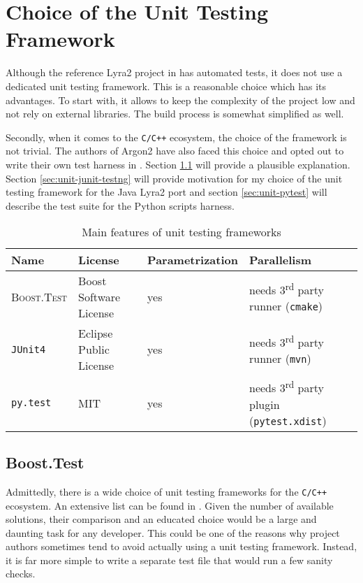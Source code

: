 \section{Choice of the Unit Testing Framework}

Although the reference Lyra2 project in \cite{github:2017:lyra} has automated tests, it does not use a dedicated unit testing framework. This is a reasonable choice which has its advantages. To start with, it allows to keep the complexity of the project low and not rely on external libraries. The build process is somewhat simplified as well.

Secondly, when it comes to the \texttt{C/C++} ecosystem, the choice of the framework is not trivial. The authors of Argon2 have also faced this choice and opted out to write their own test harness in \cite{github:2017:argon2-test.c}. Section \ref{sec:unit-boost-google} will provide a plausible explanation. Section \ref{sec:unit-junit-testng} will provide motivation for my choice of the unit testing framework for the Java Lyra2 port and section \ref{sec:unit-pytest} will describe the test suite for the Python scripts harness.

\begin{table}
\begin{tabular}{llll}
    Name & License & Parametrization & Parallelism \\ \hline
\textsc{Boost.Test} & Boost Software License & yes & needs 3\textsuperscript{rd} party runner (\texttt{cmake}) \\
\texttt{JUnit4} & Eclipse Public License & yes & needs 3\textsuperscript{rd} party runner (\texttt{mvn}) \\
\texttt{py.test} & MIT & yes & needs 3\textsuperscript{rd} party plugin (\texttt{pytest.xdist})
\end{tabular}
\caption{Main features of unit testing frameworks}
\label{table:framework-features-cpp}
\end{table}

\subsection{Boost.Test}
\label{sec:unit-boost-google}

Admittedly, there is a wide choice of unit testing frameworks for the \texttt{C/C++} ecosystem. An extensive list can be found in \cite{wiki:2017:frameworks-c, wiki:2017:frameworks-cpp}. Given the number of available solutions, their comparison and an educated choice would be a large and daunting task for any developer. This could be one of the reasons why project authors sometimes tend to avoid actually using a unit testing framework. Instead, it is far more simple to write a separate test file that would run a few sanity checks.

